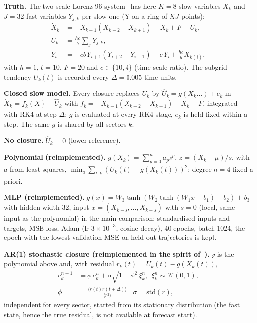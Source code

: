 \textbf{Truth.} The two-scale Lorenz-96 system~\cite{lorenz2006predictability} has here $K{=}8$ slow variables $X_k$ and $J{=}32$ fast variables $Y_{j,k}$ per slow one (Y on a ring of $KJ$ points):
\begin{align}
\dot X_k &= -X_{k-1}(X_{k-2}-X_{k+1}) - X_k + F - U_k,\\
U_k&=\tfrac{hc}{b}\textstyle\sum_{j}Y_{j,k},\\
\dot Y_i &= -cb\,Y_{i+1}(Y_{i+2}-Y_{i-1}) - c\,Y_i + \tfrac{hc}{b}X_{k(i)},
\end{align}
with $h{=}1$, $b{=}10$, $F{=}20$ and $c\in\{10,4\}$ (time-scale ratio). The subgrid tendency $U_k(t)$ is recorded every $\Delta=0.005$ time units.

\textbf{Closed slow model.} Every closure replaces $U_k$ by $\hat U_k=g(X_k\ldots)+e_k$ in $\dot X_k=f_k(X)-\hat U_k$ with $f_k=-X_{k-1}(X_{k-2}-X_{k+1})-X_k+F$, integrated with RK4 at step $\Delta$; $g$ is evaluated at every RK4 stage, $e_k$ is held fixed within a step. The same $g$ is shared by all sectors $k$.

\textbf{No closure.} $\hat U_k=0$ (lower reference).

\textbf{Polynomial (reimplemented).} $g(X_k)=\sum_{p=0}^{n}a_p z^p$, $z=(X_k-\mu)/s$, with $a$ from least squares, $\min_a\sum_{t,k}(U_k(t)-g(X_k(t)))^2$; degree $n{=}4$ fixed a priori.

\textbf{MLP (reimplemented).} $g(x)=W_3\tanh(W_2\tanh(W_1 x+b_1)+b_2)+b_3$ with hidden width 32, input $x=(X_{k-s},\dots,X_{k+s})$ with $s{=}0$ (local, same input as the polynomial) in the main comparison; standardised inputs and targets, MSE loss, Adam (lr $3\!\times\!10^{-3}$, cosine decay), 40 epochs, batch 1024, the epoch with the lowest validation MSE on held-out trajectories is kept.

\textbf{AR(1) stochastic closure (reimplemented in the spirit of~\cite{wilks2005effects}).} $g$ is the polynomial above and, with residual $r_k(t)=U_k(t)-g(X_k(t))$,
\begin{align}
e_k^{n+1}&=\phi\,e_k^{n}+\sigma\sqrt{1-\phi^2}\,\xi_k^{n},\ \ \xi_k^n\sim\mathcal N(0,1),\\
\phi&=\tfrac{\langle r(t)r(t{+}\Delta)\rangle}{\langle r^2\rangle},\ \ \sigma=\mathrm{std}(r),
\end{align}
independent for every sector, started from its stationary distribution (the fast state, hence the true residual, is not available at forecast start).

